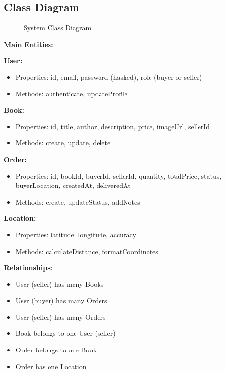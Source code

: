 \documentclass[12pt,a4paper]{article}
\begin{document}
\subsection{Class Diagram}

\begin{figure}[h]
    \centering
    \caption{System Class Diagram}
\end{figure}

\textbf{Main Entities:}

\textbf{User:}
\begin{itemize}
    \item Properties: id, email, password (hashed), role (buyer or seller)
    \item Methods: authenticate, updateProfile
\end{itemize}

\textbf{Book:}
\begin{itemize}
    \item Properties: id, title, author, description, price, imageUrl, sellerId
    \item Methods: create, update, delete
\end{itemize}

\textbf{Order:}
\begin{itemize}
    \item Properties: id, bookId, buyerId, sellerId, quantity, totalPrice, status, buyerLocation, createdAt, deliveredAt
    \item Methods: create, updateStatus, addNotes
\end{itemize}

\textbf{Location:}
\begin{itemize}
    \item Properties: latitude, longitude, accuracy
    \item Methods: calculateDistance, formatCoordinates
\end{itemize}

\textbf{Relationships:}
\begin{itemize}
    \item User (seller) has many Books
    \item User (buyer) has many Orders
    \item User (seller) has many Orders
    \item Book belongs to one User (seller)
    \item Order belongs to one Book
    \item Order has one Location
\end{itemize}
\end{document}
